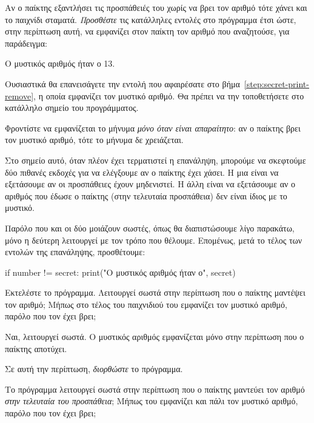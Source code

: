 \documentclass[a4paper,11pt,oneside]{book}
\begin{document}
\begin{step}
Αν ο παίκτης εξαντλήσει τις προσπάθειές του χωρίς να βρει τον αριθμό τότε χάνει και το παιχνίδι σταματά. \emph{Προσθέστε} τις κατάλληλες εντολές στο πρόγραμμα έτσι ώστε, στην περίπτωση αυτή, να εμφανίζει στον παίκτη τον αριθμό που αναζητούσε, για παράδειγμα:

\marginnote[14pt]{\iconcomputer}
\begin{pyterm}
Ο μυστικός αριθμός ήταν ο 13.
\end{pyterm}

\begin{note}
Ουσιαστικά θα επανεισάγετε την εντολή που αφαιρέσατε στο βήμα~\ref{step:secret-print-remove}, η οποία εμφανίζει τον μυστικό αριθμό. Θα πρέπει να την τοποθετήσετε στο κατάλληλο σημείο του προγράμματος.
\end{note} 

Φροντίστε να εμφανίζεται το μήνυμα \emph{μόνο όταν είναι απαραίτητο}: αν ο παίκτης βρει τον μυστικό αριθμό, τότε το μήνυμα δε χρειάζεται.

\clearpage
\begin{answer}
Στο σημείο αυτό, όταν πλέον έχει τερματιστεί η επανάληψη, μπορούμε να σκεφτούμε δύο πιθανές εκδοχές για να ελέγξουμε αν ο παίκτης έχει χάσει. Η μια είναι να εξετάσουμε αν οι προσπάθειες έχουν μηδενιστεί. Η άλλη είναι να εξετάσουμε αν ο αριθμός που έδωσε ο παίκτης (στην τελευταία προσπάθεια) δεν είναι ίδιος με το μυστικό. 

Παρόλο που και οι δύο μοιάζουν σωστές, όπως θα διαπιστώσουμε λίγο παρακάτω, μόνο η δεύτερη λειτουργεί με τον τρόπο που θέλουμε. Επομένως, μετά το τέλος των εντολών της επανάληψης, προσθέτουμε: 
	
\begin{pynew}
if number != secret: 
    print("Ο μυστικός αριθμός ήταν ο", secret)
\end{pynew}
\end{answer}

Εκτελέστε το πρόγραμμα. Λειτουργεί σωστά στην περίπτωση που ο παίκτης μαντέψει τον αριθμό; Μήπως στο τέλος του παιχνιδιού του εμφανίζει τον μυστικό αριθμό, παρόλο που τον έχει βρει;

\begin{answer}
	Ναι, λειτουργεί σωστά. Ο μυστικός αριθμός εμφανίζεται μόνο στην περίπτωση που ο παίκτης αποτύχει.
\end{answer}

Σε αυτή την περίπτωση, \emph{διορθώστε} το πρόγραμμα.

Tο πρόγραμμα λειτουργεί σωστά στην περίπτωση που ο παίκτης μαντεύει τον αριθμό \emph{στην τελευταία του προσπάθεια}; Μήπως του εμφανίζει και πάλι τον μυστικό αριθμό, παρόλο που τον έχει βρει;


\end{step}
\end{document}
